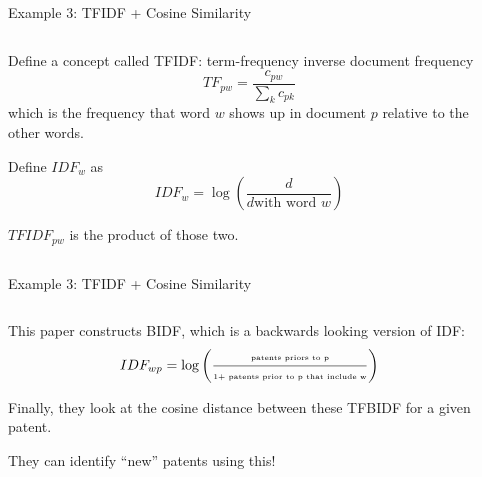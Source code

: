 \documentclass[notes,11pt, aspectratio=169]{beamer}
\newenvironment{wideitemize}{\itemize\addtolength{\itemsep}{10pt}}{\enditemize}
\begin{document}
  \begin{frame}{Example 3: TFIDF + Cosine Similarity}
    \begin{columns}[onlytextwidth, T] %
      \begin{column}{.5\textwidth}
        \begin{wideitemize}
        \item Define a concept called TFIDF: term-frequency inverse document frequency
          \begin{equation}
            TF_{pw} = \frac{c_{pw}}{\sum_{k}c_{pk}}
          \end{equation}
          which is the frequency that word $w$ shows up in document $p$ relative to the other words.
        \item Define $IDF_{w}$ as
          \begin{equation}
            IDF_{w} = \log\left(\frac{d}{d \text{with word } w}\right)
          \end{equation}
        \item $TFIDF_{pw}$ is  the product of those two.
        \end{wideitemize}
      \end{column}%
      \hfill%
      \begin{column}{.5\textwidth}
      \end{column}%
    \end{columns}
  \end{frame}

  \begin{frame}{Example 3: TFIDF + Cosine Similarity}
    \begin{columns}[onlytextwidth, T] %
      \begin{column}{.5\textwidth}
        \begin{wideitemize}
        \item This paper constructs BIDF, which is a backwards looking version of IDF:
          \begin{equation}
            \tiny IDF_{wp} = \log\left(\frac{\text{patents priors to p}}{\text{1+ patents prior to p that include w}}\right)
          \end{equation}
        \item Finally, they look at the cosine distance between these TFBIDF for a given patent.
          \item They can identify ``new'' patents using this!
        \end{wideitemize}
      \end{column}%
      \hfill%
      \begin{column}{.5\textwidth}
      \end{column}%
    \end{columns}
  \end{frame}
\end{document}
